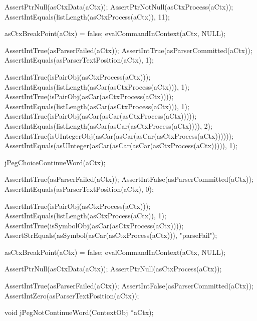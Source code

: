   AssertPtrNull(asCtxData(aCtx));
  AssertPtrNotNull(asCtxProcess(aCtx));
  AssertIntEquals(listLength(asCtxProcess(aCtx)), 11);
  
  asCtxBreakPoint(aCtx) = false;
  evalCommandInContext(aCtx, NULL);  
  
  AssertIntTrue(asParserFailed(aCtx));
  AssertIntTrue(asParserCommitted(aCtx));
  AssertIntEquals(asParserTextPosition(aCtx), 1);
  
  AssertIntTrue(isPairObj(asCtxProcess(aCtx)));
  AssertIntEquals(listLength(asCar(asCtxProcess(aCtx))), 1);
  AssertIntTrue(isPairObj(asCar(asCtxProcess(aCtx))));
  AssertIntEquals(listLength(asCar(asCtxProcess(aCtx))), 1);
  AssertIntTrue(isPairObj(asCar(asCar(asCtxProcess(aCtx)))));
  AssertIntEquals(listLength(asCar(asCar(asCtxProcess(aCtx)))), 2);
  AssertIntTrue(isUIntegerObj(asCar(asCar(asCar(asCtxProcess(aCtx))))));
  AssertIntEquals(asUInteger(asCar(asCar(asCar(asCtxProcess(aCtx))))), 1);
  
  jPegChoiceContinueWord(aCtx);
  
  AssertIntTrue(asParserFailed(aCtx));
  AssertIntFalse(asParserCommitted(aCtx));
  AssertIntEquals(asParserTextPosition(aCtx), 0);
  
  AssertIntTrue(isPairObj(asCtxProcess(aCtx)));
  AssertIntEquals(listLength(asCtxProcess(aCtx)), 1);
  AssertIntTrue(isSymbolObj(asCar(asCtxProcess(aCtx))));
  AssertStrEquals(asSymbol(asCar(asCtxProcess(aCtx))), "parseFail");
  
  asCtxBreakPoint(aCtx) = false;
  evalCommandInContext(aCtx, NULL);
  
  AssertPtrNull(asCtxData(aCtx));
  AssertPtrNull(asCtxProcess(aCtx));
  
  AssertIntTrue(asParserFailed(aCtx));
  AssertIntFalse(asParserCommitted(aCtx));
  AssertIntZero(asParserTextPosition(aCtx));
\stopCTest
\stopTestCase
\stopTestSuite

\startTestSuite[jPegNotContinueWord]

\startCHeader
void jPegNotContinueWord(ContextObj *aCtx);
\stopCHeader

